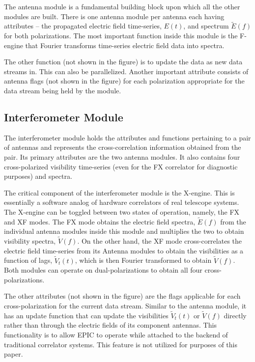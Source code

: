 \documentclass[a4paper,fleqn,usenatbib]{mnras}
\begin{document}
The antenna module is a fundamental building block upon which all the other 
modules are built. There is one antenna module per antenna each having 
attributes -- the propagated electric field time-series, $E(t)$, and spectrum 
$\widetilde{E}(f)$ for both polarizations. The most important function inside 
this module is the F-engine that Fourier transforms time-series electric field 
data into spectra. 

The other function (not shown in the figure) is to update the data as new data 
streams in. This can also be parallelized. Another important attribute consists 
of antenna flags (not shown in the figure) for each polarization appropriate 
for the data stream being held by the module. 

\subsection{Interferometer Module}

The interferometer module holds the attributes and functions pertaining to
a pair of antennas and represents the cross-correlation information obtained
from the pair. Its primary attributes are the two antenna modules. It also
contains four cross-polarized visibility time-series (even for the FX 
correlator for diagnostic purposes) and spectra. 

The critical component of the interferometer module is the X-engine. This is 
essentially a software analog of hardware correlators of real telescope 
systems. The X-engine can be toggled between two states of operation, 
namely, the FX and XF modes. The FX mode obtains the electric field spectra, 
$\widetilde{E}(f)$ from the individual antenna modules inside this module and 
multiplies the two to obtain visibility spectra, $\widetilde{V}(f)$. On the 
other hand, the XF mode cross-correlates the electric field time-series from 
its Antenna modules to obtain the visibilities as a function of lags, 
$\widetilde{V}_t(t)$, which is then Fourier transformed to obtain 
$\widetilde{V}(f)$. Both modules can operate on dual-polarizations to obtain 
all four cross-polarizations.

The other attributes (not shown in the figure) are the flags applicable for each
cross-polarization for the current data stream. Similar to the antenna module,
it has an update function that can update the visibilities $\widetilde{V}_t(t)$ 
or $\widetilde{V}(f)$ directly rather than through the electric fields of its 
component antennas. This functionality is to allow EPIC to operate while 
attached to the backend of traditional correlator systems. This feature is not 
utilized for purposes of this paper.
\end{document}
